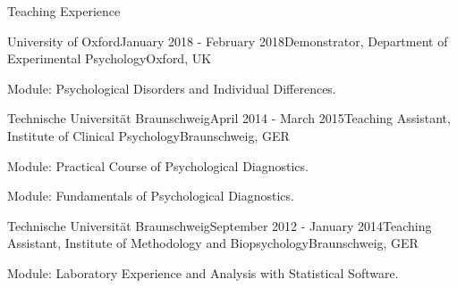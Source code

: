 \documentclass{resume} %
\begin{document}


\begin{rSection}{Teaching Experience}

\begin{rSubsection}{University of Oxford}{January 2018 - February 2018}{Demonstrator, Department of Experimental Psychology}{Oxford, UK}
\item Module: Psychological Disorders and Individual Differences.
\end{rSubsection}

\begin{rSubsection}{Technische Universit{\"a}t Braunschweig}{April 2014 - March 2015}{Teaching Assistant, Institute of Clinical Psychology}{Braunschweig, GER}
\item Module: Practical Course of Psychological Diagnostics.
\item Module: Fundamentals of Psychological Diagnostics.
\end{rSubsection}

\begin{rSubsection}{Technische Universit{\"a}t Braunschweig}{September 2012 - January 2014}{Teaching Assistant, Institute of Methodology and Biopsychology}{Braunschweig, GER}
\item Module: Laboratory Experience and Analysis with Statistical Software.
\end{rSubsection}

\end{rSection}

\end{document}
